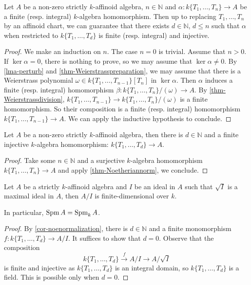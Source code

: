 \begin{thm}\label{thm-Noetheriannorm}
    Let $A$ be a non-zero strictly $k$-affinoid algebra, $n\in \mathbb{N}$ and $\alpha:k\{T_1,\ldots,T_n\}\rightarrow A$ be a finite (resp. integral) $k$-algebra homomorphism. Then up to replacing $T_1,\ldots,T_n$ by an affinoid chart, we can guarantee that there exists $d\in \mathbb{N}$, $d\leq n$ such that $\alpha$ when restricted to $k\{T_1,\ldots,T_d\}$ is finite (resp. integral) and injective.
\end{thm}
\begin{proof}
    We make an induction on $n$. The case $n=0$ is trivial. Assume that $n>0$. If $\ker \alpha=0$, there is nothing to prove, so we may assume that $\ker \alpha\neq 0$. By \cref{lma-perturb} and \cref{thm-Weierstrasspreparation}, we may assume that there is a Weierstrass polynomial $\omega\in k\{T_1,\ldots,T_{n-1}\}[T_n]$ in $\ker \alpha$. Then $\alpha$ induces a finite (resp. integral) homomorphism $\beta:k\{T_1,\ldots,T_n\}/(\omega)\rightarrow A$. By \cref{thm-Weierstrassdivision}, $k\{T_1,\ldots,T_{n-1}\}\rightarrow k\{T_1,\ldots,T_n\}/(\omega)$ is a finite homomorphism. So their composition is a finite (resp. integral) homomorphism $k\{T_1,\ldots,T_{n-1}\}\rightarrow A$. We can apply the inductive hypothesis to conclude.
\end{proof}
\begin{corollary}\label{cor-noenormalization}
    Let $A$ be a non-zero strictly $k$-affinoid algebra, then there is $d\in \mathbb{N}$ and a finite injective $k$-algebra homomorphism: $k\{T_1,\ldots,T_d\}\rightarrow A$.
\end{corollary}
\begin{proof}
    Take some $n\in \mathbb{N}$ and a surjective $k$-algebra homomorphism $k\{T_1,\ldots,T_n\}\rightarrow A$ and apply \cref{thm-Noetheriannorm}, we conclude.
\end{proof}

\begin{corollary}\label{cor-affinoidquotientfinite}
    Let $A$ be a strictly $k$-affinoid algebra and $I$ be an ideal in $A$ such that $\sqrt{I}$ is a maximal ideal in $A$, then $A/I$ is finite-dimensional over $k$.

    In particular, $\operatorname{Spm} A=\operatorname{Spm}_k A$.
\end{corollary}
\begin{proof}
    By \cref{cor-noenormalization}, there is $d\in \mathbb{N}$ and a finite monomorphism $f:k\{T_1,\ldots,T_d\}\rightarrow A/I$. It suffices to show that $d=0$. Observe that the composition 
    \[
        k\{T_1,\ldots,T_d\}\xrightarrow{f} A/I\rightarrow A/\sqrt{I}
    \]
    is finite and injective as $k\{T_1,\ldots,T_d\}$ is an integral domain, so $k\{T_1,\ldots,T_d\}$ is a field. This is possible only when $d=0$. 
\end{proof}

